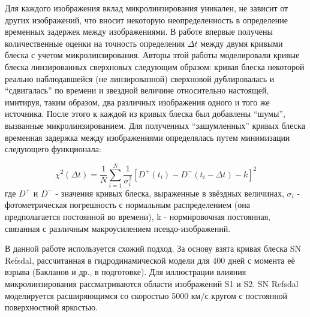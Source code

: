Для каждого изображения вклад микролинзирования уникален, не зависит от других изображений, что вносит некоторую неопределенность в определение временных задержек между изображениями. В работе \cite{doblerkeeton2006} впервые получены количественные оценки на точность определения $\Delta t$ между двумя кривыми блеска с учетом микролинзирования. Авторы этой работы моделировали кривые блеска линзированных сверхновых следующим образом: кривая блеска некоторой реально наблюдавшейся (не линзированной) сверхновой дублировалась и “сдвигалась” по времени и звездной величине относительно настоящей, имитируя, таким образом, два различных изображения одного и того же источника. После этого к каждой из кривых блеска был добавлены “шумы”, вызванные микролинзированием. Для полученных “зашумленных” кривых блеска временная задержка между изображениями определялась путем минимизации следующего функционала:

\begin{equation}\label{chi2}
\chi^{2}(\Delta t)=\frac{1}{N} \sum_{i=1}^{N} \frac{1}{\sigma_{i}^{2}}\left[D^{+}\left(t_{i}\right)-D^{-}\left(t_{i}-\Delta t\right)-k\right]^{2}
\end{equation}
где $D^+$ и $D^-$ - значения кривых блеска, выраженные в звёздных величинах, $\sigma_i$ - фотометрическая погрешность с нормальным распределением (она предполагается постоянной во времени), k - нормировочная постоянная, связанная с различным макроусилением псевдо-изображений. 

В данной работе используется схожий подход. За основу взята кривая блеска SN Refsdal, рассчитанная в гидродинамической модели для 400 дней с момента её взрыва (Бакланов и др., в подготовке). Для иллюстрации влияния микролинзирования рассматриваются области изображений S1 и S2. SN Refsdal моделируется расширяющимся со скоростью 5000 км/с кругом с постоянной поверхностной яркостью.